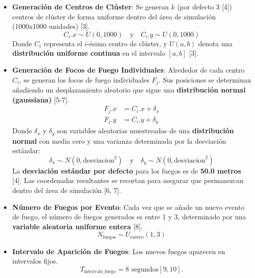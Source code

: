 \documentclass{article}
\begin{document}
\begin{itemize}
    \item \textbf{Generación de Centros de Clúster}: Se generan $k$ (por defecto 3 [4]) centros de clúster de forma uniforme dentro del área de simulación (1000x1000 unidades) [3].
    \begin{equation*}
        C_i.x \sim U(0, 1000) \quad \text{y} \quad C_i.y \sim U(0, 1000)
    \end{equation*}
    Donde $C_i$ representa el $i$-ésimo centro de clúster, y $U(a, b)$ denota una \textbf{distribución uniforme continua} en el intervalo $[a, b]$ [3].

    \item \textbf{Generación de Focos de Fuego Individuales}: Alrededor de cada centro $C_i$, se generan los focos de fuego individuales $F_j$. Sus posiciones se determinan añadiendo un desplazamiento aleatorio que sigue una \textbf{distribución normal (gaussiana)} [5-7].
    \begin{align*}
        F_j.x &= C_i.x + \delta_x \\
        F_j.y &= C_i.y + \delta_y
    \end{align*}
    Donde $\delta_x$ y $\delta_y$ son variables aleatorias muestreadas de una \textbf{distribución normal} con media cero y una varianza determinada por la desviación estándar:
    \begin{equation*}
        \delta_x \sim N(0, \text{desviacion}^2) \quad \text{y} \quad \delta_y \sim N(0, \text{desviacion}^2)
    \end{equation*}
    La \textbf{desviación estándar por defecto} para los fuegos es de \textbf{50.0 metros} [4]. Las coordenadas resultantes se recortan para asegurar que permanezcan dentro del área de simulación [6, 7].

    \item \textbf{Número de Fuegos por Evento}: Cada vez que se añade un nuevo evento de fuego, el número de fuegos generados es entre 1 y 3, determinado por una \textbf{variable aleatoria uniforme entera} [8].
    \begin{equation*}
        N_{\text{fuegos}} \sim U_{\text{entero}}(1, 3)
    \end{equation*}

    \item \textbf{Intervalo de Aparición de Fuegos}: Los nuevos fuegos aparecen en intervalos fijos.
    \begin{equation*}
        T_{\text{intervalo\_fuego}} = 8 \text{ segundos} [9, 10].
    \end{equation*}
\end{itemize}
\end{document}
